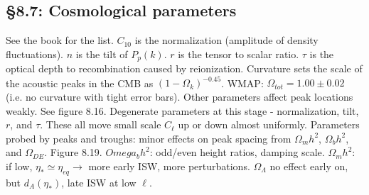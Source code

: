 \documentclass[12pt]{article}
\begin{document}
\subsection*{\S8.7: Cosmological parameters}
See the book for the list.  $C_{10}$ is the normalization (amplitude of density fluctuations).  $n$ is the tilt of $P_p(k)$.  $r$ is the tensor to scalar ratio. $\tau$ is the optical depth to recombination caused by reionization.  Curvature sets the scale of the acoustic peaks in the CMB as $(1-\Omega_k)^{-0.45}$.  WMAP: $\Omega_{tot} = 1.00\pm0.02$ (i.e. no curvature with tight error bars).  Other parameters affect peak locations weakly.  See figure 8.16.  Degenerate parameters at this stage - normalization, tilt, $r$, and $\tau$.  These all move small scale $C_\ell$ up or down almost uniformly.  Parameters probed by peaks and troughs: minor effects on peak spacing from $\Omega_mh^2$, $\Omega_bh^2$, and $\Omega_{DE}$.  Figure 8.19.  $Omega_bh^2$: odd/even height ratios, damping scale.  $\Omega_mh^2$: if low, $\eta_*\simeq\eta_{eq}\rightarrow$ more early ISW, more perturbations.  $\Omega_\Lambda$ no effect early on, but $d_A(\eta_*)$, late ISW at low $\ell$.
\end{document}

